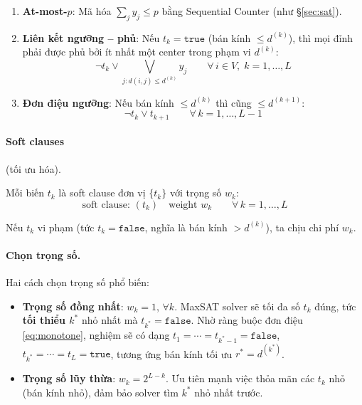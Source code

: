 \documentclass[11pt,a4paper]{article}
\begin{document}
\begin{enumerate}[nosep, label=(H\arabic*)]
    \item \textbf{At-most-$p$}: Mã hóa $\sum_j y_j \le p$ bằng Sequential Counter (như §\ref{sec:sat}).
    \label{hc:cardinality}

    \item \textbf{Liên kết ngưỡng -- phủ}: Nếu $t_k = \texttt{true}$ (bán kính $\le d^{(k)}$), thì mọi đỉnh phải được phủ bởi ít nhất một center trong phạm vi $d^{(k)}$:
    \begin{equation}
        \neg t_k \lor \bigvee_{j: d(i,j) \le d^{(k)}} y_j \qquad \forall\, i \in V,\; k = 1, \dots, L
        \label{eq:maxsat_coverage}
    \end{equation}
    \label{hc:coverage}

    \item \textbf{Đơn điệu ngưỡng}: Nếu bán kính $\le d^{(k)}$ thì cũng $\le d^{(k+1)}$:
    \begin{equation}
        \neg t_k \lor t_{k+1} \qquad \forall\, k = 1, \dots, L-1
        \label{eq:monotone}
    \end{equation}
    \label{hc:monotone}
\end{enumerate}

\paragraph{Soft clauses} (tối ưu hóa).

Mỗi biến $t_k$ là soft clause đơn vị $\{t_k\}$ với trọng số $w_k$:
\begin{equation}
    \text{soft clause: } (t_k) \quad \text{weight } w_k \qquad \forall\, k = 1, \dots, L
    \label{eq:soft}
\end{equation}

Nếu $t_k$ vi phạm (tức $t_k = \texttt{false}$, nghĩa là bán kính $> d^{(k)}$), ta chịu chi phí $w_k$.

\paragraph{Chọn trọng số.}

Hai cách chọn trọng số phổ biến:
\begin{itemize}[nosep]
    \item \textbf{Trọng số đồng nhất}: $w_k = 1$, $\forall k$.
    MaxSAT solver sẽ tối đa số $t_k$ đúng, tức \textbf{tối thiểu $k^*$} nhỏ nhất mà $t_{k^*} = \texttt{false}$.
    Nhờ ràng buộc đơn điệu \eqref{eq:monotone}, nghiệm sẽ có dạng $t_1 = \cdots = t_{k^*-1} = \texttt{false}$, $t_{k^*} = \cdots = t_L = \texttt{true}$, tương ứng bán kính tối ưu $r^* = d^{(k^*)}$.

    \item \textbf{Trọng số lũy thừa}: $w_k = 2^{L-k}$.
    Ưu tiên mạnh việc thỏa mãn các $t_k$ nhỏ (bán kính nhỏ), đảm bảo solver tìm $k^*$ nhỏ nhất trước.
\end{itemize}
\end{document}
